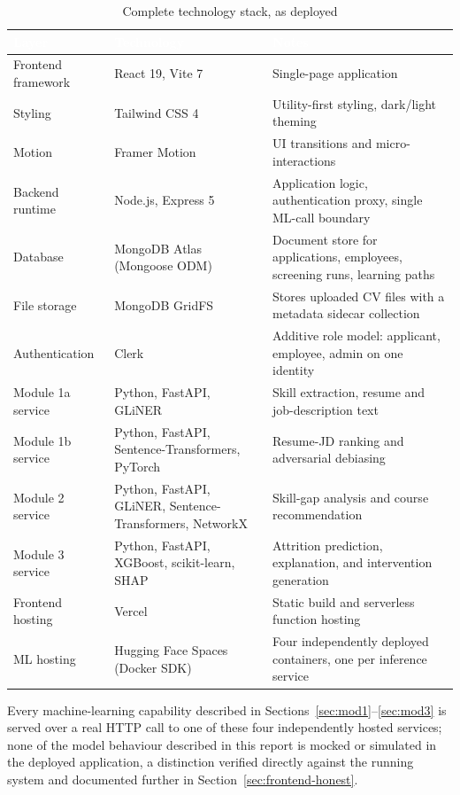 \documentclass[11pt,a4paper]{article}
\newcommand{\hdrow}{\rowcolor{TPnavy}}
\newcommand{\hdtxt}[1]{\textcolor{white}{\bfseries #1}}
\begin{document}
\begin{table}[H]
\centering
\caption{Complete technology stack, as deployed}
\label{tab:full-stack}
\small
\begin{tabular}{p{2.8cm}p{4.6cm}p{6.6cm}}
\toprule
\hdrow \hdtxt{Layer} & \hdtxt{Technology} & \hdtxt{Notes} \\
\midrule
Frontend framework & React 19, Vite 7 & Single-page application \\
\rowcolor{TPlight}
Styling & Tailwind CSS 4 & Utility-first styling, dark/light theming \\
Motion & Framer Motion & UI transitions and micro-interactions \\
\rowcolor{TPlight}
Backend runtime & Node.js, Express 5 & Application logic, authentication proxy, single ML-call boundary \\
Database & MongoDB Atlas (Mongoose ODM) & Document store for applications, employees, screening runs, learning paths \\
\rowcolor{TPlight}
File storage & MongoDB GridFS & Stores uploaded CV files with a metadata sidecar collection \\
Authentication & Clerk & Additive role model: applicant, employee, admin on one identity \\
\rowcolor{TPlight}
Module 1a service & Python, FastAPI, GLiNER & Skill extraction, resume and job-description text \\
Module 1b service & Python, FastAPI, Sentence-Transformers, PyTorch & Resume-JD ranking and adversarial debiasing \\
\rowcolor{TPlight}
Module 2 service & Python, FastAPI, GLiNER, Sentence-Transformers, NetworkX & Skill-gap analysis and course recommendation \\
Module 3 service & Python, FastAPI, XGBoost, scikit-learn, SHAP & Attrition prediction, explanation, and intervention generation \\
\rowcolor{TPlight}
Frontend hosting & Vercel & Static build and serverless function hosting \\
ML hosting & Hugging Face Spaces (Docker SDK) & Four independently deployed containers, one per inference service \\
\bottomrule
\end{tabular}
\end{table}

Every machine-learning capability described in Sections~\ref{sec:mod1}--\ref{sec:mod3} is served over a real HTTP call to one of these four independently hosted services; none of the model behaviour described in this report is mocked or simulated in the deployed application, a distinction verified directly against the running system and documented further in Section~\ref{sec:frontend-honest}.
\end{document}
